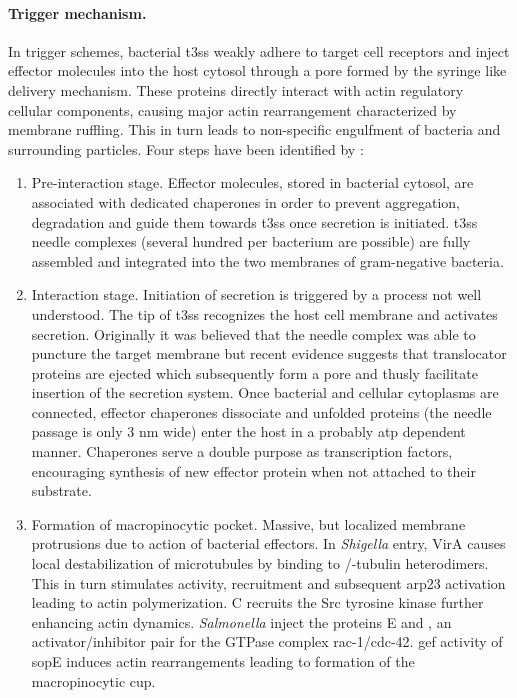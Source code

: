 \paragraph{Trigger mechanism.}
In trigger schemes, bacterial \gls{t3ss} weakly adhere to target cell receptors and inject effector molecules into the host cytosol through a pore formed by the syringe like delivery mechanism. These proteins directly interact with actin regulatory cellular components, causing major actin rearrangement characterized by membrane ruffling. This in turn leads to non-specific engulfment of bacteria and surrounding particles. Four steps have been identified by \citeauthor{Cossart2004}:
\begin{enumerate}[label=(\alph*)]
  \item Pre-interaction stage. Effector molecules, stored in bacterial cytosol, are associated with dedicated chaperones in order to prevent aggregation, degradation and guide them towards \gls{t3ss} once secretion is initiated. \Gls{t3ss} needle complexes (several hundred per bacterium are possible) are fully assembled and integrated into the two membranes of gram-negative bacteria.
  \item Interaction stage. Initiation of secretion is triggered by a process not well understood. The tip of \gls{t3ss} recognizes the host cell membrane and activates secretion. Originally it was believed that the needle complex was able to puncture the target membrane but recent evidence suggests that translocator proteins are ejected which subsequently form a pore and thusly facilitate insertion of the secretion system. Once bacterial and cellular cytoplasms are connected, effector chaperones dissociate and unfolded proteins (the needle passage is only 3 nm wide) enter the host in a probably \gls{atp} dependent manner. Chaperones serve a double purpose as transcription factors, encouraging synthesis of new effector protein when not attached to their substrate.
  \item Formation of macropinocytic pocket. Massive, but localized membrane protrusions due to action of bacterial effectors. In \textit{Shigella} entry, VirA causes local destabilization of microtubules by binding to \textalpha/\textbeta-tubulin heterodimers. This in turn stimulates  activity,  recruitment and subsequent \gls{arp23} activation leading to actin polymerization. C recruits the Src tyrosine kinase further enhancing actin dynamics. \textit{Salmonella} inject the proteins E and , an activator/inhibitor pair for the GTPase complex \gls{rac-1}/\gls{cdc-42}. \Gls{gef} activity of \acrshort{sop}E induces actin rearrangements leading to formation of the macropinocytic cup.

\end{enumerate}
